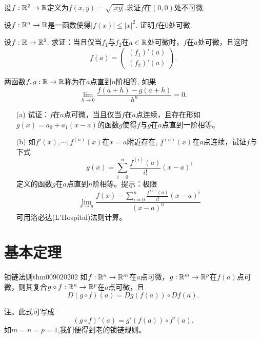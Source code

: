 \begin{problemset}
\item 设$f:\mathbb{R}^2 \to \mathbb{R}$定义为$f(x, y) = \sqrt{|xy|}$.求证$f$在$(0, 0)$处不可微.

\item 设$f:\mathbb{R}^n \to \mathbb{R}$是一函数使得$|f(x)| \le |x|^2$. 证明$f$在0处可微.

\item 设$f:\mathbb{R} \to \mathbb{R}^2$. 求证：当且仅当$f_1$与$f_2$在$a \in \mathbb{R}$处可微时，$f$在$a$处可微，且这时
\[
f(a) = \begin{pmatrix}
(f_1)'(a)\\
(f_2)'(a)
\end{pmatrix}.
\]


\item 两函数$f,g:\mathbb{R} \to \mathbb{R}$称为在$a$点直到$n$阶相等, 如果
\[
\lim_{h \to 0}{\frac{f(a+h) - g(a+h)}{h^n}} = 0.
\]
\begin{enumerate}
\item[(a)] 试证：$f$在$a$点可微，当且仅当$f$在$a$点连续，且存在形如$g(x)=a_0 + a_1(x-a)$的函数$g$使得$f$与$g$在$a$点直到一阶相等。
\item[(b)] 如$f'(x),\cdots,f^{(n)}(x)$在$x=a$附近存在, $f^{(n)}(x)$在$a$点连续，试证$f$与下式
\[
g(x) = \sum_{i=0}^{n}{\frac{f^{(i)}(a)}{i!}(x-a)^i}
\]
定义的函数$g$在$a$点直到$n$阶相等。提示：极限
\[
\lim_{x \to a}{\frac{f(x) - \sum_{i=0}^{n}{\frac{f^{(i)}(a)}{i!}(x-a)^i}}{(x-a)^n}}
\]
可用洛必达(L'Hospital)法则计算。
\end{enumerate}

\end{problemset}


\section{基本定理}\label{section0090202}
\begin{theorem}{锁链法则}{thm009020202}
如$f:\mathbb{R}^n \to \mathbb{R}^m$在$a$点可微，$g:\mathbb{R}^m \to \mathbb{R}^p$在$f(a)$点可微，则其复合$g \circ f: \mathbb{R}^n \to \mathbb{R}^p$在$a$点可微，且
\[
D(g \circ f)(a) = Dg(f(a)) \circ Df(a).
\]
\end{theorem}

注。此式可写成
\[
(g \circ f)'(a) = g'(f(a)) \circ f'(a).
\]
如$m=n=p=1$,我们便得到老的锁链规则。

